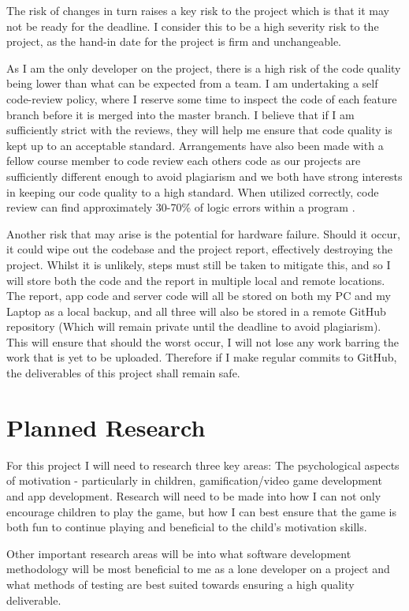 The risk of changes in turn raises a key risk to the project which is that it may not be ready for the deadline. 
I consider this to be a high severity risk to the project, as the hand-in date for the project is firm and unchangeable. 

As I am the only developer on the project, there is a high risk of the code quality being lower than what can be expected from a team.
I am undertaking a self code-review policy, where I reserve some time to inspect the code of each feature branch before it is merged into the master branch.
I believe that if I am sufficiently strict with the reviews, they will help me ensure that code quality is kept up to an acceptable standard.
Arrangements have also been made with a fellow course member to code review each others code as our projects are sufficiently different enough to avoid plagiarism and we both have strong interests in keeping our code quality to a high standard.
When utilized correctly, code review can find approximately 30-70\% of logic errors within a program \citep{myers2011art}.

Another risk that may arise is the potential for hardware failure. 
Should it occur, it could wipe out the codebase and the project report, effectively destroying the project. 
Whilst it is unlikely, steps must still be taken to mitigate this, and so I will store both the code and the report in multiple local and remote locations.
The report, app code and server code will all be stored on both my PC and my Laptop as a local backup, and all three will also be stored in a remote GitHub repository (Which will remain private until the deadline to avoid plagiarism).
This will ensure that should the worst occur, I will not lose any work barring the work that is yet to be uploaded.
Therefore if I make regular commits to GitHub, the deliverables of this project shall remain safe. 

\section{Planned Research}
For this project I will need to research three key areas: The psychological aspects of motivation - particularly in children, gamification/video game development and app development.
Research will need to be made into how I can not only encourage children to play the game, but how I can best ensure that the game is both fun to continue playing and beneficial to the child's motivation skills.

Other important research areas will be into what software development methodology will be most beneficial to me as a lone developer on a project and what methods of testing are best suited towards ensuring a high quality deliverable.